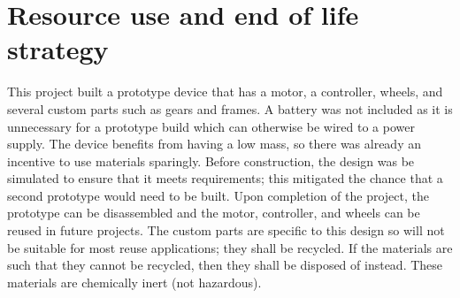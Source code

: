 \chapter{Resource use and end of life strategy}

This project built a prototype device that has a motor, a controller, wheels, and several custom parts such as gears and frames. A battery was not included as it is unnecessary for a prototype build which can otherwise be wired to a power supply.
The device benefits from having a low mass, so there was already an incentive to use materials sparingly. Before construction, the design was be simulated to ensure that it meets requirements; this mitigated the chance that a second prototype would need to be built. Upon completion of the project, the prototype can be disassembled and the motor, controller, and wheels can be reused in future projects. The custom parts are specific to this design so will not be suitable for most reuse applications; they shall be recycled. If the materials are such that they cannot be recycled, then they shall be disposed of instead. These materials are chemically inert (not hazardous).
